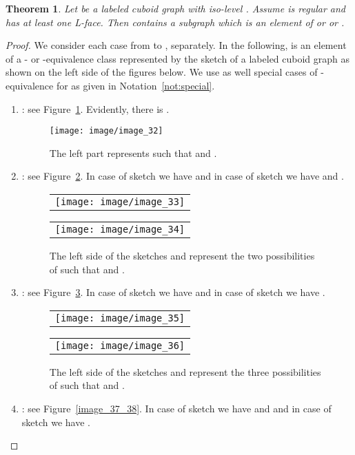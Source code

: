 \documentclass[a4paper,11pt]{article}
\newtheorem{theorem}{Theorem}[section]
\begin{document}
\begin{theorem}\label{thm:class-1}
Let  be a labeled cuboid graph with iso-level . Assume  is regular and
has at least one L-face. Then  contains a subgraph  which is an element of
 or  or .
\end{theorem}
\begin{proof}
We consider each case from  to , separately. In the following,  is an element of a
- or -equivalence class represented by the sketch of a labeled cuboid graph as shown on
the left side of the figures below. We use as well special cases of -equivalence for  as given
in Notation~\ref{not:special}.
\begin{enumerate}
\item : see Figure~\ref{image_32}. Evidently, there is .
\begin{figure}[!ht]
\texttt{[image: image/image\_32]}
\caption{The left part represents  such that  and .}
\label{image_32}
\end{figure}
\FloatBarrier
\item : see Figure~\ref{image_33_34}. In case of sketch  we have  and in case
of sketch  we have  and .
\begin{figure}[!ht]

\begin{tabular}[c]{l}
\texttt{[image: image/image\_33]}
\end{tabular}
\hspace{1cm}
\begin{tabular}[c]{l}
\texttt{[image: image/image\_34]}
\end{tabular}
\caption{The left side of the sketches  and  represent the two possibilities of  such that  and
.}
\label{image_33_34}
\end{figure}
\FloatBarrier
\item : see Figure~\ref{image_35_36}. In case of sketch  we have  and in case
of sketch  we have .
\begin{figure}[!ht]

\begin{tabular}[c]{l}
\texttt{[image: image/image\_35]}
\end{tabular}
\hspace{0.8cm}
\begin{tabular}[c]{l}
\texttt{[image: image/image\_36]}
\end{tabular}
\caption{The left side of the sketches  and  represent the three possibilities of  such that 
and .}
\label{image_35_36}
\end{figure}
\FloatBarrier
\item : see Figure~\ref{image_37_38}. In case of sketch  we have  and
 and in case of sketch  we have .
\begin{figure}[!ht]


\end{figure}
\end{enumerate}
\end{proof}
\end{document}

